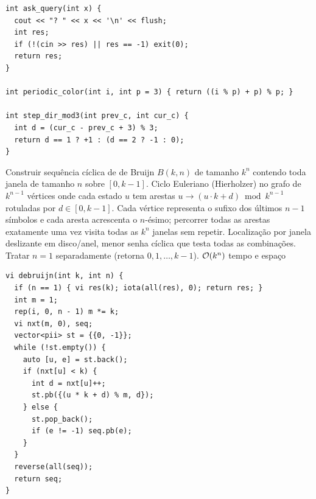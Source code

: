 \begin{lstlisting}
int ask_query(int x) {
  cout << "? " << x << '\n' << flush;
  int res;
  if (!(cin >> res) || res == -1) exit(0);
  return res;
}

int periodic_color(int i, int p = 3) { return ((i % p) + p) % p; }

int step_dir_mod3(int prev_c, int cur_c) {
  int d = (cur_c - prev_c + 3) % 3;
  return d == 1 ? +1 : (d == 2 ? -1 : 0);
}
\end{lstlisting}

\algobox
  {Construir sequência cíclica de de Bruijn $B(k, n)$ de tamanho $k^n$ contendo toda janela de tamanho $n$ sobre $[0, k-1]$.}
  {Ciclo Euleriano (Hierholzer) no grafo de $k^{n-1}$ vértices onde cada estado $u$ tem arestas $u \to (u \cdot k + d) \bmod k^{n-1}$ rotuladas por $d \in [0, k-1]$.}
  {Cada vértice representa o sufixo dos últimos $n-1$ símbolos e cada aresta acrescenta o $n$-ésimo; percorrer todas as arestas exatamente uma vez visita todas as $k^n$ janelas sem repetir.}
  {Localização por janela deslizante em disco/anel, menor senha cíclica que testa todas as combinações.}
  {Tratar $n = 1$ separadamente (retorna $0, 1, \dots, k-1$).}
  {$\mathcal{O}(k^n)$ tempo e espaço}

\begin{lstlisting}
vi debruijn(int k, int n) {
  if (n == 1) { vi res(k); iota(all(res), 0); return res; }
  int m = 1;
  rep(i, 0, n - 1) m *= k;
  vi nxt(m, 0), seq;
  vector<pii> st = {{0, -1}};
  while (!st.empty()) {
    auto [u, e] = st.back();
    if (nxt[u] < k) {
      int d = nxt[u]++;
      st.pb({(u * k + d) % m, d});
    } else {
      st.pop_back();
      if (e != -1) seq.pb(e);
    }
  }
  reverse(all(seq));
  return seq;
}
\end{lstlisting}
